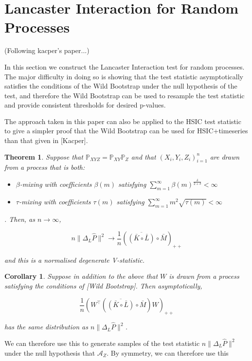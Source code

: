 \documentclass{article}
\newtheorem{theorem}{Theorem}
\newtheorem{corollary}{Corollary}
\begin{document}
\section{Lancaster Interaction for Random Processes}

(Following kacper's paper...)

In this section we construct the Lancaster Interaction test for random processes. The major difficulty in doing so is showing that the test statistic asymptotically satisfies the conditions of the Wild Bootstrap under the null hypothesis of the test, and therefore the Wild Bootstrap can be used to resample the test statistic and provide consistent thresholds for desired p-values.

The approach taken in this paper can also be applied to the HSIC test statistic to give a simpler proof that the Wild Bootstrap can be used for HSIC+timeseries than that given in [Kacper].

\begin{theorem}
Suppose that $\mathbb{P}_{XYZ} = \mathbb{P}_{XY}\mathbb{P}_Z$ and that $(X_i,Y_i,Z_i)_{i=1}^n$ are drawn from a process that is both:

\begin{itemize}
\item $\beta$-mixing with coefficients $\beta(m)$ satisfying $\sum_{m=1}^{\infty}\beta(m)^{\frac{\delta}{2+\delta}}<\infty$
\item $\tau$-mixing with coefficients $\tau(m)$ satisfying $\sum_{m=1}^\infty m^2 \sqrt{\tau(m)} < \infty$
\end{itemize} . Then, as $n\longrightarrow \infty$, 

\[ n\| \Delta_L\hat{P} \|^2 \longrightarrow \frac{1}{n}\left( \overline{\left( \bar{K} \circ \bar{L}\right) }\circ \bar{M} \right) _{++} \]

and this is a normalised degenerate V-statistic.
\end{theorem}

\begin{corollary}
Suppose in addition to the above that $W$ is drawn from a process satisfying the conditions of [Wild Bootstrap]. Then asymptotically,

\[\frac{1}{n}\left(W^\intercal\left( \overline{\left( \bar{K} \circ \bar{L}\right) }\circ \bar{M} \right)W\right) _{++}\]

has the same distribution as $ n\| \Delta_L\hat{P} \|^2$. 
\end{corollary}

We can therefore use this to generate samples of the test statistic $ n\| \Delta_L\hat{P} \|^2$ under the null hypothesis that $\mathcal{A}_Z$. By symmetry, we can therefore use this 
\end{document}
